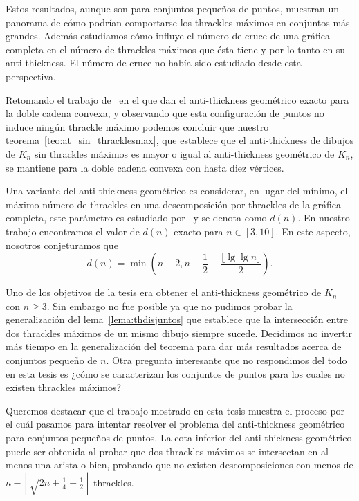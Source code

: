 Estos resultados, aunque son para conjuntos pequeños de puntos, muestran un panorama de cómo podrían
comportarse los thrackles máximos en conjuntos más grandes. Además estudiamos cómo influye el número de
cruce de una gráfica completa en el número de thrackles máximos que ésta tiene y por lo tanto en su
anti-thickness. El número de cruce no había sido estudiado desde esta perspectiva.

Retomando el trabajo de~\cite{Lomeli2018} en el que dan el anti-thickness geométrico exacto para la doble
cadena convexa, y observando que esta configuración de puntos no induce ningún thrackle máximo podemos
concluir que nuestro teorema~\ref{teo:at_sin_thracklesmax}, que establece que el anti-thickness de dibujos
de $K_n$ sin thrackles máximos es mayor o igual al anti-thickness geométrico de $K_n$, se mantiene para la
doble cadena convexa con hasta diez vértices.

Una variante del anti-thickness geométrico es considerar, en lugar del mínimo, el máximo número de
thrackles en una descomposición por thrackles de la gráfica completa, este parámetro es estudiado
por~\cite{Araujo2005} y se denota como $d(n)$. En nuestro trabajo encontramos el valor de $d(n)$ exacto
para $n \in [3,10]$. En este aspecto, nosotros conjeturamos que
\[
d(n) =  \min\left(n-2,n-\frac{1}{2}-\frac{\lfloor \lg \lg n\rfloor}{2}\right).
\]

Uno de los objetivos de la tesis era obtener el anti-thickness geométrico de $K_n$ con $n\geq 3$. Sin
embargo no fue posible ya que no pudimos probar la generalización del lema~\ref{lema:thdisjuntos} que
establece que la intersección entre dos thrackles máximos de un mismo dibujo siempre sucede. Decidimos no
invertir más tiempo en la generalización del teorema para dar más resultados acerca de conjuntos pequeño de
$n$. Otra pregunta interesante que no respondimos del todo en esta tesis es ¿cómo se caracterizan los
conjuntos de puntos para los cuales no existen thrackles máximos?

Queremos destacar que el trabajo mostrado en esta tesis muestra el proceso por el cuál pasamos para
intentar resolver el problema del anti-thickness geométrico para conjuntos pequeños de puntos. La cota
inferior del anti-thickness geométrico puede ser obtenida al probar que dos thrackles máximos se
intersectan en al menos una arista o bien, probando que no existen descomposiciones con menos de $n -
\left\lfloor \sqrt{2n + \frac{1}{4}} - \frac{1}{2}\right\rfloor$ thrackles.

